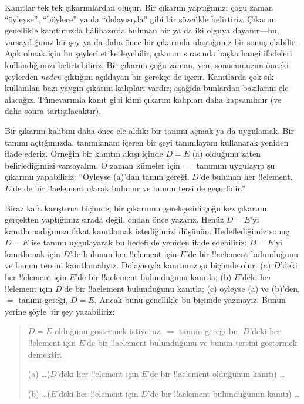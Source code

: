 \documentclass[../../../include/open-logic-section]{subfiles}
\begin{document}


Kanıtlar tek tek çıkarımlardan oluşur. Bir çıkarım yaptığımızı çoğu
zaman ``öyleyse'', ``böylece'' ya da ``dolayısıyla'' gibi bir sözcükle
belirtiriz. Çıkarım genellikle kanıtımızda hâlihazırda bulunan bir ya da
iki olguya dayanır---bu, varsaydığımız bir şey ya da daha önce bir
çıkarımla ulaştığımız bir sonuç olabilir. Açık olmak için bu şeyleri
etiketleyebilir, çıkarım sırasında başka hangi ifadeleri kullandığımızı
belirtebiliriz. Bir çıkarım çoğu zaman, yeni sonucumuzun önceki
şeylerden \emph{neden} çıktığını açıklayan bir gerekçe de içerir.
Kanıtlarda çok sık kullanılan bazı yaygın çıkarım kalıpları vardır;
aşağıda bunlardan bazılarını ele alacağız. Tümevarımla kanıt gibi kimi
çıkarım kalıpları daha kapsamlıdır (ve daha sonra tartışılacaktır).

Bir çıkarım kalıbını daha önce ele aldık: bir tanımı açmak ya da
uygulamak. Bir tanımı açtığımızda, tanımlananı içeren bir şeyi
tanımlayanı kullanarak yeniden ifade ederiz. Örneğin bir kanıtın
akışı içinde $D = E$ (a) olduğunu zaten belirlediğimizi varsayalım.
O zaman kümeler için $=$ tanımını uygulayıp şu çıkarımı yapabiliriz:
``Öyleyse (a)'dan tanım gereği, $D$'de bulunan her !!{element}, $E$'de
de bir !!a{element} olarak bulunur ve bunun tersi de geçerlidir.''

Biraz kafa karıştırıcı biçimde, bir çıkarımın gerekçesini çoğu kez
çıkarımı gerçekten yaptığımız sırada değil, ondan önce yazarız. Henüz
$D = E$'yi kanıtlamadığımızı fakat kanıtlamak istediğimizi düşünün.
Hedeflediğimiz sonuç $D = E$ ise tanımı uygulayarak bu hedefi de yeniden
ifade edebiliriz: $D = E$'yi kanıtlamak için $D$'de bulunan her
!!{element} için $E$'de bir !!a{element} bulunduğunu ve bunun tersini
kanıtlamalıyız. Dolayısıyla kanıtımız şu biçimde olur: (a) $D$'deki her
!!{element} için $E$'de bir !!a{element} bulunduğunu kanıtla; (b)
$E$'deki her !!{element} için $D$'de bir !!a{element} bulunduğunu kanıtla; (c)
öyleyse (a) ve (b)'den, $=$ tanımı gereği, $D = E$. Ancak bunu genellikle
bu biçimde yazmayız. Bunun yerine şöyle bir şey yazabiliriz:
\begin{quote}
$D = E$ olduğunu göstermek istiyoruz. $=$ tanımı gereği bu, $D$'deki
her !!{element} için $E$'de bir !!a{element} bulunduğunu ve bunun tersini
göstermek demektir.

(a) \dots ($D$'deki her !!{element} için $E$'de bir !!a{element}
olduğunun kanıtı) \dots

(b) \dots ($E$'deki her !!{element} için
$D$'de bir !!a{element} bulunduğunun kanıtı) \dots
\end{quote}
\end{document}
